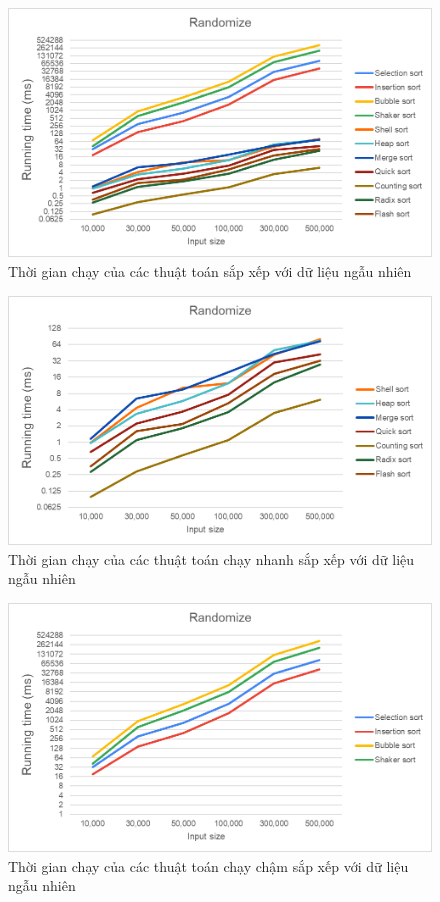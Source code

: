     \begin{figure}[H]
        \centering
        \includegraphics[width = 0.9\linewidth]{img/experiment/running time/randomized/1.png}
        \caption{Thời gian chạy của các thuật toán sắp xếp với dữ liệu ngẫu nhiên}
    \end{figure}

    \begin{figure}[H]
        \centering   
        \includegraphics[width = 0.9\linewidth]{img/experiment/running time/randomized/2.png}
        \caption{Thời gian chạy của các thuật toán chạy nhanh sắp xếp với dữ liệu ngẫu nhiên}
    \end{figure}

    \begin{figure}[H]
        \centering        
        \includegraphics[width = 0.9\linewidth]{img/experiment/running time/randomized/3.png}
        \caption{Thời gian chạy của các thuật toán chạy chậm sắp xếp với dữ liệu ngẫu nhiên}
    \end{figure}

